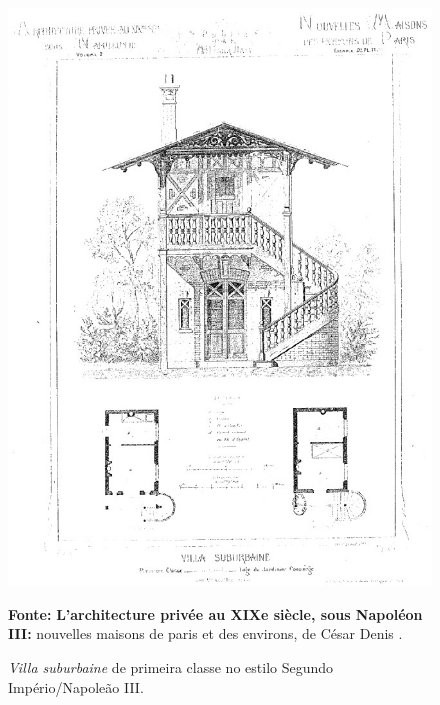 \begin{figure}[!htp]
\centering
\caption{\textit{Villa suburbaine} de primeira classe no estilo Segundo Império/Napoleão III.}
\includegraphics[width=1\textwidth]{2-cap1/complementos/fotos/daly03-4.JPEG}{\par \footnotesize \textbf{Fonte:} \textbf{L’architecture privée au XIXe siècle, sous Napoléon III:} nouvelles maisons de paris et des environs, de César Denis . \par}
\label{fig:villaprimclas} 
\end{figure}

